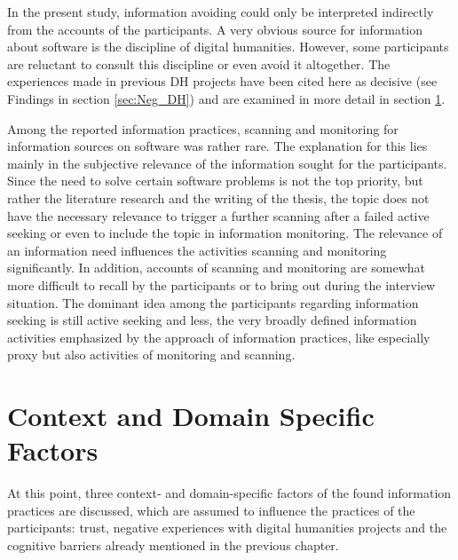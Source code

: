 \documentclass[12pt, a4paper, titlepage, oneside, abstract=true, toc=listof, toc=bibliography, BCOR=1cm]{scrreprt}
\begin{document}
{%
In the present study, information avoiding could only be interpreted indirectly from the accounts of the participants. A very obvious source for information about software is the discipline of digital humanities. However, some participants are reluctant to consult this discipline or even avoid it altogether. The experiences made in previous DH projects have been cited here as decisive (see Findings in section \ref{sec:Neg_DH}) and are examined in more detail in section \ref{sec:Disc_Context}. 

Among the reported information practices, scanning and monitoring for information sources on software was rather rare. The explanation for this lies mainly in the subjective relevance \citep{Schamber1990} of the information sought for the participants. Since the need to solve certain software problems is not the top priority, but rather the literature research and the writing of the thesis, the topic does not have the necessary relevance to trigger a further scanning after a failed active seeking or even to include the topic in information monitoring. The relevance of an information need influences the activities scanning and monitoring significantly. In addition, accounts of scanning and monitoring are somewhat more difficult to recall by the participants or to bring out during the interview situation. The dominant idea among the participants regarding information seeking is still active seeking and less, the very broadly defined information activities emphasized by the approach of information practices, like especially proxy but also activities of monitoring and scanning.

\section{Context and Domain Specific Factors}
\label{sec:Disc_Context}
At this point, three context- and domain-specific factors of the found information practices are discussed, which are assumed to influence the practices of the participants: trust, negative experiences with digital humanities projects and the cognitive barriers already mentioned in the previous chapter.

}
\end{document}
